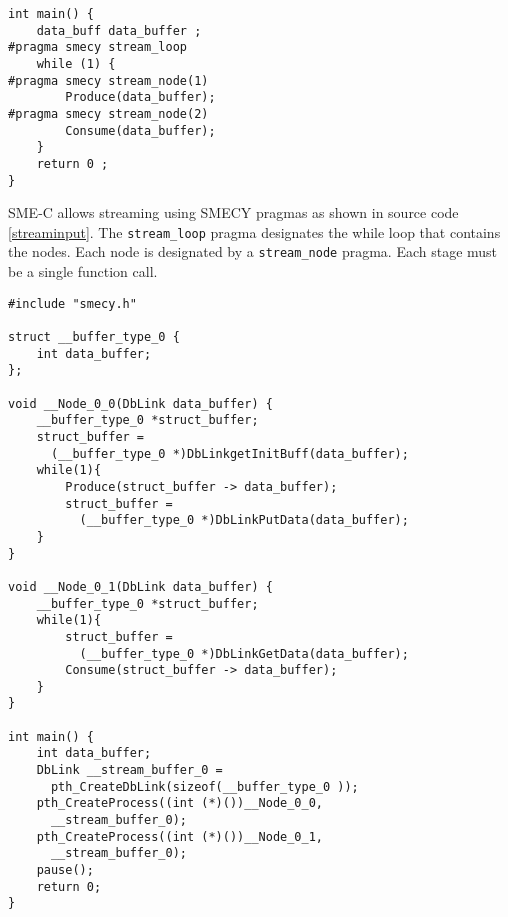 \documentclass [A4]{article}
\begin{document}
	\begin{lstlisting}[label=streaminput,caption={Input code with streaming pragmas. Definitions of functions \texttt{Produce} and \texttt{Consume} are not shown.}]
int main() {
	data_buff data_buffer ;
#pragma smecy stream_loop
	while (1) {
#pragma smecy stream_node(1)
		Produce(data_buffer);
#pragma smecy stream_node(2)
		Consume(data_buffer);
	}
	return 0 ;
}
	\end{lstlisting}
	
	SME-C allows streaming using SMECY pragmas as shown in source code \ref{streaminput}. The \verb+stream_loop+ pragma designates the while loop that contains the nodes. Each node is designated by a \verb+stream_node+ pragma. Each stage must be a single function call.
	
	\begin{lstlisting}[label=streamoutput,caption={Possible output code. Definitions of functions \texttt{Produce} and \texttt{Consume} are not shown.}]
#include "smecy.h" 

struct __buffer_type_0 {
	int data_buffer;
};

void __Node_0_0(DbLink data_buffer) {
	__buffer_type_0 *struct_buffer;
	struct_buffer =
	  (__buffer_type_0 *)DbLinkgetInitBuff(data_buffer);
	while(1){
		Produce(struct_buffer -> data_buffer);
		struct_buffer = 
		  (__buffer_type_0 *)DbLinkPutData(data_buffer);
	}
}

void __Node_0_1(DbLink data_buffer) {
	__buffer_type_0 *struct_buffer;
	while(1){
		struct_buffer = 
		  (__buffer_type_0 *)DbLinkGetData(data_buffer);
		Consume(struct_buffer -> data_buffer);
	}
}

int main() {
	int data_buffer;
	DbLink __stream_buffer_0 = 
	  pth_CreateDbLink(sizeof(__buffer_type_0 ));
	pth_CreateProcess((int (*)())__Node_0_0,
	  __stream_buffer_0);
	pth_CreateProcess((int (*)())__Node_0_1,
	  __stream_buffer_0);
	pause();
	return 0;
}
	\end{lstlisting}
	
\end{document}
